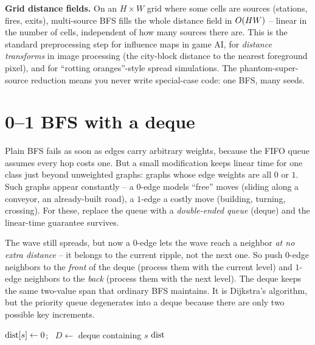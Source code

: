 \begin{applicationbox}
\textbf{Grid distance fields.} On an $H\times W$ grid where some cells are sources
(stations, fires, exits), multi-source BFS fills the whole distance field in
$O(HW)$ -- linear in the number of cells, independent of how many sources there
are. This is the standard preprocessing step for influence maps in game AI, for
\emph{distance transforms} in image processing (the city-block distance to the
nearest foreground pixel), and for ``rotting oranges''-style spread simulations.
The phantom-super-source reduction means you never write special-case code: one
BFS, many seeds.
\end{applicationbox}

\section{0--1 BFS with a deque}
\label{ch02:01bfs}

Plain BFS fails as soon as edges carry arbitrary weights, because the FIFO queue assumes
every hop costs one. But a small modification keeps linear time for one class
just beyond unweighted graphs: graphs whose edge weights
are all $0$ or $1$. Such graphs appear constantly -- a $0$-edge models ``free''
moves (sliding along a conveyor, an already-built road), a $1$-edge a costly move
(building, turning, crossing). For these, replace the queue with a
\emph{double-ended queue} (deque) and the linear-time guarantee survives.

\begin{intuitionbox}
The wave still spreads, but now a $0$-edge lets the wave reach a neighbor
\emph{at no extra distance} -- it belongs to the current ripple, not the next
one. So push $0$-edge neighbors to the \emph{front} of the deque (process them
with the current level) and $1$-edge neighbors to the \emph{back} (process them
with the next level). The deque keeps the same two-value span that ordinary BFS
maintains. It is Dijkstra's algorithm, but the priority queue degenerates into a
deque because there are only two possible key increments.
\end{intuitionbox}

\begin{algorithm}[H]
\DontPrintSemicolon
{}
$\operatorname{dist}[s]\gets 0$; \ $D\gets$ deque containing $s$\;
\Return $\operatorname{dist}$\;
\caption{\textsc{ZeroOneBfs}$(\Gph,w,s)$ -- 0--1 BFS with a deque}
\label{ch02:alg-01}
\end{algorithm}

